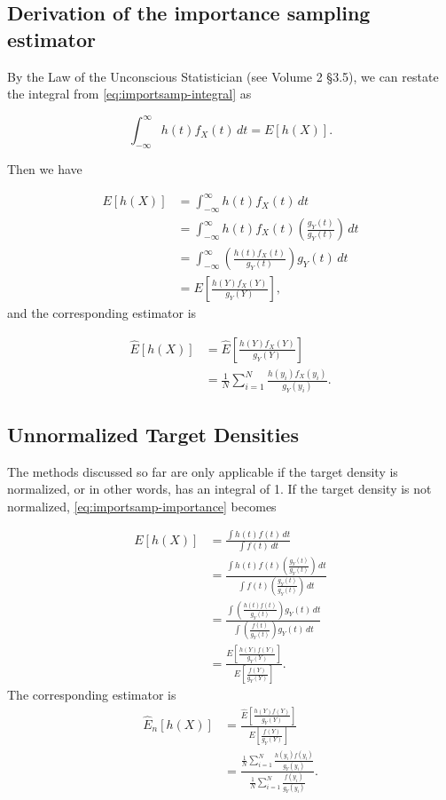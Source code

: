 \subsection*{Derivation of the importance sampling estimator}

By the Law of the Unconscious Statistician (see Volume 2 \S 3.5), we can restate the integral from \eqref{eq:importsamp-integral} as

$$\int_{-\infty}^{\infty} h(t)f_X(t)\,dt = E[h(X)].$$

Then we have

\begin{align*}
E[h(X)] & = \int_{-\infty}^{\infty} h(t)f_X(t)\,dt \\
& = \int_{-\infty}^{\infty} h(t)f_X(t)\left ( \frac{g_Y(t)}{g_Y(t)} \right )\,dt \\
& = \int_{-\infty}^{\infty} \left ( \frac{h(t)f_X(t)}{g_Y(t)} \right )g_Y(t)\,dt \\
& = E\left[\frac{h(Y)f_X(Y)}{g_Y(Y)}\right],
\end{align*}
and the corresponding estimator is

\begin{align*}
\widehat{E}[h(X)] & = \widehat{E}\left [ \frac{h(Y)f_X(Y)}{g_Y(Y)}\right ] \\
& = \frac{1}{N}\sum_{i = 1}^{N}\frac{h(y_i)f_X(y_i)}{g_Y(y_i)}.
\end{align*}

\subsection*{Unnormalized Target Densities} %

The methods discussed so far are only applicable if the target density is normalized, or in other words, has an integral of 1. If the target density is not normalized, \eqref{eq:importsamp-importance} becomes

\begin{align*}
E[h(X)] & = \frac{\int h(t)f(t)\,dt}{\int f(t)\,dt} \\
& = \frac{\int h(t)f(t) \left ( \frac{g_Y(t)}{g_Y(t)} \right )\,dt}{{\int f(t)} \left ( \frac{g_Y(t)}{g_Y(t)} \right )\,dt} \\
& = \frac{\int \left ( \frac{h(t)f(t)}{g_Y(t)} \right ) g_Y(t)\,dt}{\int \left ( \frac{f(t)}{g_Y(t)} \right ) g_Y(t)\,dt} \\
& = \frac{E\left [ \frac{h(Y)f(Y)}{g_Y(Y)}\right ]}{E\left [ \frac{f(Y)}{g_Y(Y)}\right]}.
\end{align*}
The corresponding estimator is
\begin{align*}
\widehat{E}_n[h(X)] & = \frac{\widehat{E}\left [ \frac{h(Y)f(Y)}{g_Y(Y)}\right ]}{\widehat{E}\left [ \frac{f(Y)}{g_Y(Y)}\right ]} \\
& = \frac{\frac{1}{N}\sum_{i = 1}^{N}\frac{h(y_i)f(y_i)}{g_Y(y_i)}}{\frac{1}{N}\sum_{i = 1}^{N}\frac{f(y_i)}{g_Y(y_i)}}.
\end{align*}
